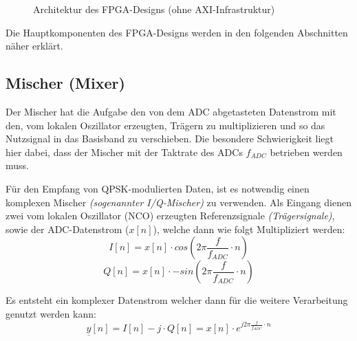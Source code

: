 \begin{figure}[h]
	\caption{Architektur des \acs{FPGA}-Designs (ohne \acs{AXI}-Infrastruktur)}
\end{figure}

Die Hauptkomponenten des \acs{FPGA}-Designs werden in den folgenden Abschnitten näher erklärt.

\subsection{Mischer (Mixer)}
Der Mischer hat die Aufgabe den von dem \acs{ADC} abgetasteten Datenstrom mit den, vom lokalen Oszillator erzeugten, Trägern zu multiplizieren und so das Nutzsignal in das
Basisband zu verschieben. Die besondere Schwierigkeit liegt hier dabei, dass der Mischer mit der Taktrate des \acs{ADC}s $f_{ADC}$ betrieben werden muss.

Für den Empfang von \acs{QPSK}-modulierten Daten, ist es notwendig einen komplexen Mischer \textit{(sogenannter I/Q-Mischer)} zu verwenden.
Als Eingang dienen zwei vom lokalen Oszillator (\acs{NCO}) erzeugten Referenzsignale \textit{(Trägersignale)}, sowie der \acs{ADC}-Datenstrom ($x[n]$),
welche dann wie folgt Multipliziert werden: 
\begin{equation}
	I[n] = x[n]\cdot cos(2\pi\frac{f}{f_{ADC}}\cdot n) 
\end{equation}
\begin{equation}
	Q[n] = x[n]\cdot -sin(2\pi\frac{f}{f_{ADC}}\cdot n) 
\end{equation}

Es entsteht ein komplexer Datenstrom welcher dann für die weitere Verarbeitung genutzt werden kann:
\begin{equation}
	\underline{y}[n] = I[n] - j \cdot Q[n] = x[n]\cdot e^{j2\pi\frac{f}{f_{ADC}}\cdot n}
\end{equation}

